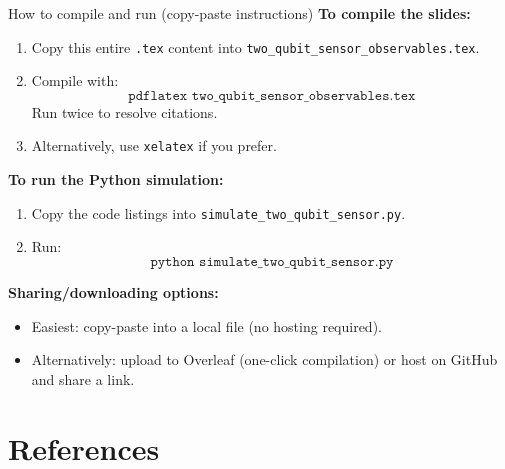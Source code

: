 \documentclass[aspectratio=169]{beamer}
\begin{document}
\begin{frame}{How to compile and run (copy-paste instructions)}
\small
\textbf{To compile the slides:}
\begin{enumerate}
\item Copy this entire \texttt{.tex} content into \texttt{two\_qubit\_sensor\_observables.tex}.
\item Compile with:
\[
\texttt{pdflatex two\_qubit\_sensor\_observables.tex}
\]
Run twice to resolve citations.
\item Alternatively, use \texttt{xelatex} if you prefer.
\end{enumerate}

\vspace{0.35em}
\textbf{To run the Python simulation:}
\begin{enumerate}
\item Copy the code listings into \texttt{simulate\_two\_qubit\_sensor.py}.
\item Run:
\[
\texttt{python simulate\_two\_qubit\_sensor.py}
\]
\end{enumerate}

\vspace{0.35em}
\textbf{Sharing/downloading options:}
\begin{itemize}
\item Easiest: copy-paste into a local file (no hosting required).
\item Alternatively: upload to Overleaf (one-click compilation) or host on GitHub and share a link.
\end{itemize}
\end{frame}

\section{References}
\end{document}
